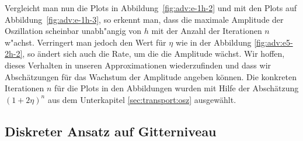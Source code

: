 
Vergleicht man nun die Plots in Abbildung~\ref{fig:adv:e-1h-2} und mit den Plots auf Abbildung~\ref{fig:adv:e-1h-3}, so erkennt man, dass die maximale Amplitude der Oszillation scheinbar unabh"angig von $h$ mit der Anzahl der Iterationen $n$ w"achst.
Verringert man jedoch den Wert für $\eta$ wie in der Abbildung \ref{fig:adv:e5-2h-2}, so ändert sich auch die Rate, um die die Amplitude wächst.
Wir hoffen, dieses Verhalten in unseren Approximationen wiederzufinden und dass wir Abschätzungen für das Wachstum der Amplitude angeben können.
Die konkreten Iterationen $n$ für die Plots in den Abbildungen wurden mit Hilfe der Abschätzung $(1 + 2 \eta)^n$ aus dem Unterkapitel \ref{sec:transport:osz} ausgewählt.



\subsection {Diskreter Ansatz auf Gitterniveau} \label{sec:transport:diskret}

